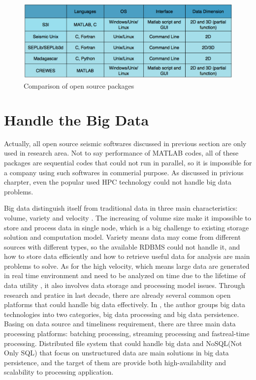 \begin{figure}[h]
\centering
\includegraphics[scale=.42]{figures/open_package_list.png}
\caption{Comparison of open source packages \cite{CeGPS3I}}
\label{open_package_list}
\end{figure}

\section{Handle the Big Data}
Actually, all open source seismic softwares discussed in previous section are only used in research area. Not to say performance of MATLAB codes, all of these packages are sequential codes that could not run in parallel, so it is impossible for a company using such softwares in commerial purpose. As discussed in privious charpter, even the popular used HPC technology could not handle big data problems. 

Big data distinguish itself from traditional data in three main characteristics: volume, variety and velocity \cite{CharactOfBigData}. The increasing of volume size make it impossible to store and process data in single node, which is a big challenge to existing storage solution and computation model. Variety means data may come from different sources with different types, so the available RDBMS could not handle it, and how to store data efficiently and how to retrieve useful data for analysis are main problems to solve. As for the high velocity, which means large data are generated in real time environment and need to be analyzed on time due to the lifetime of data utility \cite{CharactOfBigData}, it also involves data storage and processing model issues. Through research and pratice in last decade, there are already several common open platforms that could handle big data effectively. In \cite{ChallengeOfBigData}, the author groups big data technologies into two categories, big data processing and big data persistence. Basing on data source and timeliness requirement, there are three main data processing platforms: batching processing, streaming processing and fast\/real-time processing. Distributed file system that could handle big data and NoSQL(Not Only SQL) that focus on unstructured data are main solutions in big data persistence, and the target of them are provide both high-availability and scalability to processing application.  

